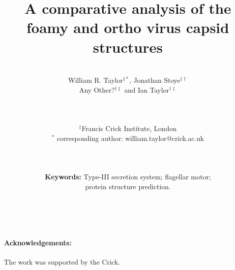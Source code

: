 \documentclass[12pt]{article}
\begin{document}
\title{\bf A comparative analysis of the foamy and ortho virus capsid structures
}

\author{\\William R. Taylor$^{\ddagger*}$,
Jonathan Stoye$^{\ddagger\dagger}$\\
Any Other?$^{\dagger\ddagger}$
and
Ian Taylor$^{\dagger\ddagger}$\\ \\ \\ \\
$^\ddagger$Francis Crick Institute, London\\
$^*$ corresponding author: william.taylor@crick.ac.uk\\ \\ \\ \\
{\bf Keywords:} Type-III secretion system; flagellar motor;\\ protein structure prediction.\\ \\ \\
}
\begin{singlespace}
\maketitle
\end{singlespace}
\clearpage

\clearpage

\clearpage

\clearpage

\clearpage

\clearpage
\begin{singlespace}


\paragraph{Acknowledgements:}
The work was supported by the Crick.
%
\end{singlespace}
\end{document}
